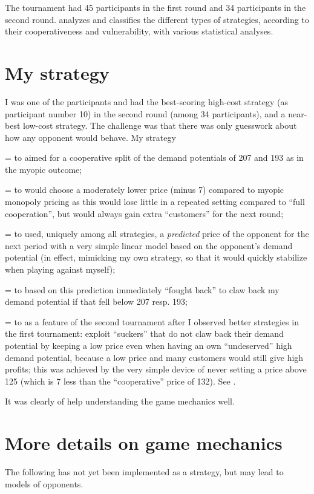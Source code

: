 \documentclass[a4paper,12pt]{article}  %
\def\rmitem#1{\par\hangafter=1\hangindent=\einr
  \noindent\hbox to\einr{\ignorespaces#1\hfill}\ignorespaces}
\newcommand\bullitem{\rmitem{\raise.17ex\hbox{\kern7pt\scriptsize$\bullet$}}}
\theoremstyle{definition}
\begin{document}
The tournament had 45 participants in the first round and 34
participants in the second round.
\citet{Keser1992} analyzes and classifies the different types of
strategies, according to their cooperativeness and
vulnerability, with various statistical analyses.

\section{My strategy}

I was one of the participants and had the best-scoring
high-cost strategy (as participant number 10)
in the second round (among 34
participants), and a near-best low-cost strategy.
The challenge was that there was only guesswork about how
any opponent would behave.
My strategy
\bullitem
aimed for a cooperative split of the demand potentials of 
  207 and 193 as in the myopic outcome;
\bullitem
would choose a moderately lower price (minus 7) compared
  to myopic monopoly pricing as this would lose little in a
  repeated setting compared to ``full cooperation'', but would
  always gain extra ``customers'' for the next round; 
\bullitem
used, uniquely among all strategies, a \textit{predicted} price
  of the opponent for the next period with a very simple
  linear model based on the opponent's demand potential (in
  effect, mimicking my own strategy, so that it would
  quickly stabilize when playing against myself);
\bullitem
based on this prediction immediately ``fought back'' to claw
back my demand potential if that fell below 207 resp. 193;

\bullitem
as a feature of the second tournament after I observed
  better strategies in the first tournament: exploit
  ``suckers'' that do not claw back their demand potential by
  keeping a low price even when having an own ``undeserved''
  high demand potential, because a low price and many
  customers would still give high profits; this was achieved
  by the very simple device of never setting a price above
  125 (which is 7 less than the ``cooperative'' price of 132). 
  See \citet[page 81]{Keser1993}.

It was clearly of help understanding the game mechanics
well.

\section{More details on game mechanics}

The following has not yet been implemented as a strategy,
but may lead to models of opponents.
\end{document}
